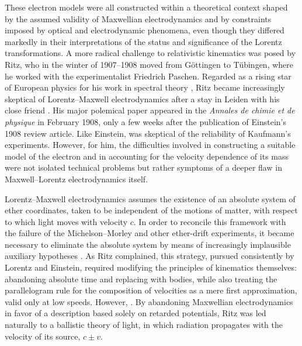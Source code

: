 \documentclass[pdflatex]{sn-jnl}
\begin{document}
These electron models were all constructed within a theoretical context shaped by the assumed validity of Maxwellian electrodynamics and by constraints imposed by optical and electrodynamic phenomena, even though they differed markedly in their interpretations of the status and significance of the Lorentz transformations. A more radical challenge to relativistic kinematics was posed by Ritz, who in the winter of 1907--1908 moved from Göttingen to Tübingen, where he worked with the experimentalist Friedrich Paschen. Regarded as a rising star of European physics for his work in spectral theory \citep{Hentschel2012}, Ritz became increasingly skeptical of Lorentz--Maxwell electrodynamics after a stay in Leiden with his close friend \Ehr \citep{Martinez2004-04}. His major polemical paper appeared in the \emph{Annales de chimie et de physique} in February 1908, only a few weeks after the publication of Einstein’s 1908 review article. Like Einstein, \citet[147--48]{Ritz1908a} was skeptical of the reliability of Kaufmann’s experiments. However, for him, the difficulties involved in constructing a suitable model of the electron and in accounting for the velocity dependence of its mass were not isolated technical problems but rather symptoms of a deeper flaw in Maxwell--Lorentz electrodynamics itself.


Lorentz--Maxwell electrodynamics assumes the existence of an absolute system of ether coordinates, taken to be independent of the motions of matter, with respect to which light moves with velocity $c$. In order to reconcile this framework with the failure of the Michelson--Morley and other ether-drift experiments, it became necessary to eliminate the absolute system by means of increasingly implausible auxiliary hypotheses \citep[148]{Ritz1908a}. As Ritz complained, this strategy, pursued consistently by Lorentz and Einstein, required modifying the principles of kinematics themselves: abandoning absolute time and replacing  with  bodies, while also treating the parallelogram rule for the composition of velocities as a mere first approximation, valid only at low speeds. However,  \citep[148]{Ritz1908a}. By abandoning Maxwellian electrodynamics in favor of a description based solely on retarded potentials, Ritz was led naturally to a ballistic theory of light, in which radiation propagates with the velocity of its source, $c \pm v$.
\end{document}

